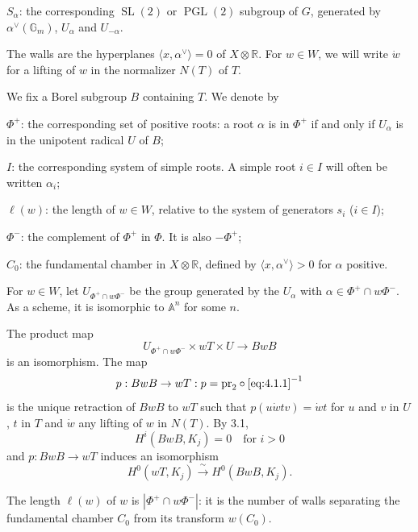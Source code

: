 \documentclass[11pt,a4paper]{article}
\theoremstyle{plain}
\theoremstyle{definition}
\newcommand{\bA}{\mathbb{A}}
\newcommand{\bR}{\mathbb{R}}
\newcommand{\Gm}{{\mathbb{G}_m}}
\DeclareMathOperator{\SL}{SL}
\DeclareMathOperator{\PGL}{PGL}
\newcommand{\pr}{\mathrm{pr}}
\begin{document}
$S_\alpha$: the corresponding $\SL(2)$ or $\PGL(2)$ subgroup of $G$, generated by $\alpha^\vee(\Gm)$, $U_\alpha$ and $U_{-\alpha}$.

The walls are the hyperplanes $\langle x, \alpha^\vee \rangle = 0$ of $X \otimes \bR$. For $w \in W$, we will write $\dot{w}$ for a lifting of $w$ in the normalizer $N(T)$ of $T$.

We fix a Borel subgroup $B$ containing $T$. We denote by

$\Phi^+$: the corresponding set of positive roots: a root $\alpha$ is in $\Phi^+$ if and only if $U_\alpha$ is in the unipotent radical $U$ of $B$;

$I$: the corresponding system of simple roots. A simple root $i \in I$ will often be written $\alpha_i$;

$\ell(w)$: the length of $w \in W$, relative to the system of generators $s_i$ ($i \in I$);

$\Phi^-$: the complement of $\Phi^+$ in $\Phi$. It is also $-\Phi^+$;

$C_0$: the fundamental chamber in $X \otimes \bR$, defined by $\langle x, \alpha^\vee \rangle > 0$ for $\alpha$ positive.

For $w \in W$, let $U_{\Phi^+ \cap w\Phi^-}$ be the group generated by the $U_\alpha$ with $\alpha \in \Phi^+ \cap w\Phi^-$. As a scheme, it is isomorphic to $\bA^n$ for some $n$.

The product map
\begin{equation}\label{eq:4.1.1}
U_{\Phi^+ \cap w\Phi^-} \times wT \times U \to BwB
\end{equation}
is an isomorphism. The map
\begin{equation}\label{eq:4.1.2}
p: BwB \to wT: p = \pr_2 \circ \text{\eqref{eq:4.1.1}}^{-1}
\end{equation}
is the unique retraction of $BwB$ to $wT$ such that $p(u \dot{w} t v) = \dot{w} t$ for $u$ and $v$ in $U$, $t$ in $T$ and $\dot{w}$ any lifting of $w$ in $N(T)$. By 3.1,
\begin{equation}\label{eq:4.1.3}
H^i(BwB, K_j) = 0 \quad \text{for } i > 0
\end{equation}
and $p: BwB \to wT$ induces an isomorphism
\begin{equation}\label{eq:4.1.4}
H^0(wT, K_j) \xrightarrow{\;\sim\;} H^0(BwB, K_j).
\end{equation}

The length $\ell(w)$ of $w$ is $|\Phi^+ \cap w\Phi^-|$: it is the number of walls separating the fundamental chamber $C_0$ from its transform $w(C_0)$.
\end{document}
